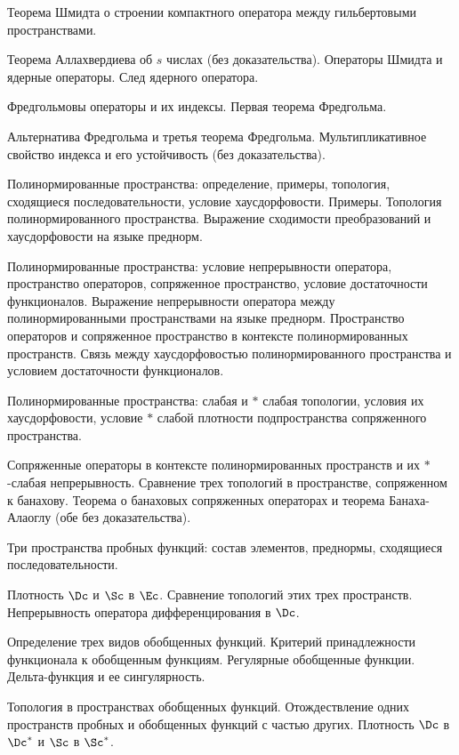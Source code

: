 \documentclass[a4paper]{article}
\begin{document}
\begin{nums}{-3}
\item Теорема Шмидта о строении компактного оператора между гильбертовыми пространствами.
\item Теорема Аллахвердиева об $s$ числах (без доказательства). Операторы Шмидта и
ядерные операторы. След ядерного оператора.
\item Фредгольмовы операторы и их индексы. Первая теорема Фредгольма.
\item Альтернатива Фредгольма и третья теорема Фредгольма. Мультипликативное свойство
индекса и его устойчивость (без доказательства).
\item Полинормированные пространства: определение, примеры, топология, сходящиеся последовательности, условие хаусдорфовости.
Примеры. Топология полинормированного пространства. Выражение сходимости преобразований и хаусдорфовости на языке преднорм.
\item Полинормированные пространства: условие непрерывности оператора, пространство операторов, сопряженное пространство,
условие достаточности функционалов.  Выражение непрерывности оператора между полинормированными пространствами на языке преднорм.
Пространство операторов и сопряженное пространство в контексте полинормированных пространств. Связь между хаусдорфовостью
полинормированного пространства и условием достаточности функционалов.
\item Полинормированные пространства: слабая и $*$ слабая топологии, условия их хаусдорфовости, условие $*$ слабой
плотности подпространства сопряженного пространства.
\item Сопряженные операторы в контексте полинормированных пространств и их $*$-слабая непрерывность.
Сравнение трех топологий в пространстве, сопряженном к банахову. Теорема о банаховых сопряженных
операторах и теорема Банаха-Алаоглу (обе без доказательства).
\item  Три пространства пробных функций: состав элементов, преднормы, сходящиеся последовательности.
\item Плотность $\Dc$ и $\Sc$ в $\Ec$. Сравнение топологий этих трех пространств.
Непрерывность оператора дифференцирования в $\Dc$.
\item  Определение трех видов обобщенных функций. Критерий принадлежности
функционала к обобщенным функциям. Регулярные обобщенные функции.
Дельта-функция и ее сингулярность.
\item  Топология в пространствах обобщенных функций. Отождествление одних пространств пробных
и обобщенных функций с частью других. Плотность $\Dc$ в $\Dc^*$ и $\Sc$ в $\Sc^*$.

\end{nums}
\end{document}
